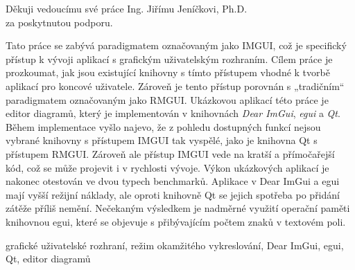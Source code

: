 \documentclass[FM,DP]{tulthesis}
\begin{document}
	
	\begin{acknowledgement}
		Děkuji vedoucímu své práce Ing. Jiřímu Jeníčkovi, Ph.D.\\ za poskytnutou podporu.
	\end{acknowledgement}
	
	\begin{abstractCZ}
		Tato práce se zabývá paradigmatem označovaným jako IMGUI, což je specifický přístup k vývoji aplikací s grafickým uživatelským rozhraním. Cílem práce je prozkoumat, jak jsou existující knihovny s tímto přístupem vhodné k tvorbě aplikací pro koncové uživatele. Zároveň je tento přístup porovnán s „tradičním“ paradigmatem označovaným jako RMGUI. Ukázkovou aplikací této práce je editor diagramů, který je implementován v knihovnách \textit{Dear ImGui}, \textit{egui} a \textit{Qt}. Během implementace vyšlo najevo, že z pohledu dostupných funkcí nejsou vybrané knihovny s přístupem IMGUI tak vyspělé, jako je knihovna Qt s přístupem RMGUI. Zároveň ale přístup \mbox{IMGUI} vede na kratší a přímočařejší kód, což se může projevit i v rychlosti vývoje. Výkon ukázkových aplikací je nakonec otestován ve dvou typech benchmarků. Aplikace v Dear ImGui a egui mají vyšší režijní náklady, ale oproti knihovně Qt se jejich spotřeba po přidání zátěže příliš nemění. Nečekaným výsledkem je nadměrné využití operační paměti knihovnou egui, které se objevuje s přibývajícím počtem znaků v textovém poli.
	\end{abstractCZ}
	
	\begin{keywordsCZ}
		grafické uživatelské rozhraní, režim okamžitého vykreslování, Dear ImGui, egui, Qt, editor diagramů
	\end{keywordsCZ}
	
	\clearpage
	
\end{document}
